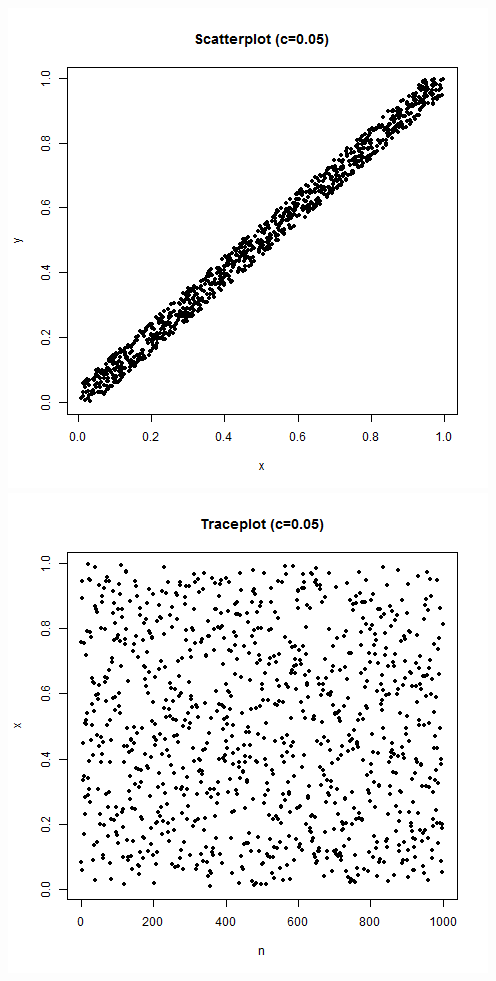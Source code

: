 \documentclass{article}
\begin{document}
\begin{enumerate}
\begin{enumerate}
\includegraphics[scale=0.4]{scat_005x.png}
\includegraphics[scale=0.4]{trace_005x.png} \\


\end{enumerate}
\end{enumerate}
\end{document}
